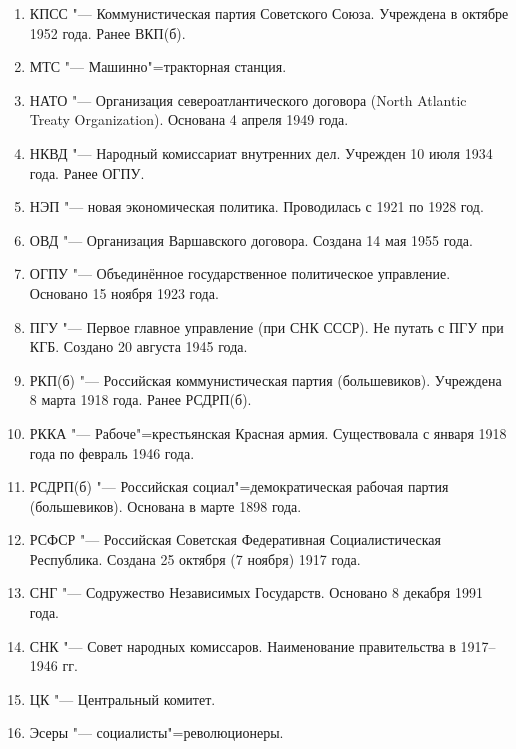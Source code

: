 \begin{enumerate}
    \item КПСС "--- Коммунистическая партия Советского Союза. Учреждена в октябре 1952 года. Ранее ВКП(б).
    \item МТС "--- Машинно"=тракторная станция. \\
    \item НАТО "--- Организация североатлантического договора (North Atlantic Treaty Organization). Основана 4 апреля 1949 года. \\
    \item НКВД "--- Народный комиссариат внутренних дел. Учрежден 10 июля 1934 года. Ранее ОГПУ. \\
    \item НЭП "--- новая экономическая политика. Проводилась с 1921 по 1928 год. \\
    \item ОВД "--- Организация Варшавского договора. Создана 14 мая 1955 года. \\
    \item ОГПУ "--- Объединённое государственное политическое управление. Основано 15 ноября 1923 года. \\
    \item ПГУ "--- Первое главное управление (при СНК СССР). Не путать с ПГУ при КГБ. Создано 20 августа 1945 года. \\
    \item РКП(б) "--- Российская коммунистическая партия (большевиков). Учреждена 8 марта 1918 года. Ранее РСДРП(б). \\
    \item РККА "--- Рабоче"=крестьянская Красная армия. Существовала с января 1918 года по февраль 1946 года. \\
    \item РСДРП(б) "--- Российская социал"=демократическая рабочая партия (большевиков). Основана в марте 1898 года. \\
    \item РСФСР "--- Российская Советская Федеративная Социалистическая Республика. Создана 25 октября (7 ноября) 1917 года. \\
    \item СНГ "--- Содружество Независимых Государств. Основано 8 декабря 1991 года. \\
    \item СНК "--- Совет народных комиссаров. Наименование правительства в 1917--1946 гг. \\
    \item ЦК "--- Центральный комитет. \\
    \item Эсеры "--- социалисты"=революционеры. \\
\end{enumerate}
